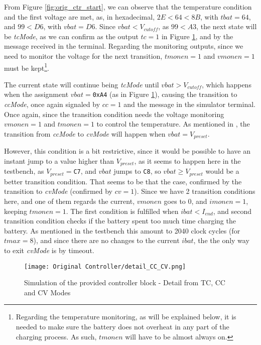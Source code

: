 \documentclass[12pt]{article}
\begin{document}
From Figure \ref{fig:orig_ctr_start}, we can observe that the temperature condition and the first voltage are met, as, in hexadecimal, $2E<64<8B$, with $tbat=64$, and $99<D6$, with $vbat=D6$. Since $vbat<V_{cutoff}$, as $99<A3$, the next state will be \textit{tcMode}, as we can confirm as the output $tc=1$ in Figure \ref{fig:orig_cc_cv}, and by the message received in the terminal. Regarding the monitoring outputs, since we need to monitor the voltage for the next transition, $tmonen=1$ and $vmonen=1$ must be kept\footnote{Regarding the temperature monitoring, as will be explained below, it is needed to make sure the battery does not overheat in any part of the charging process. As such, $tmonen$ will have to be almost always on.}.

The current state will continue being \textit{tcMode} until $vbat>V_{cutoff}$, which happens when the assignment $vbat=$\texttt{0xA4} (as in Figure \ref{fig:orig_cc_cv}), causing the transition to \textit{ccMode}, once again signaled by $cc=1$ and the message in the simulator terminal. Once again, since the transition condition needs the voltage monitoring $vmonen=1$ and $tmonen=1$ to control the temperature. As mentioned in \cite{batchargerPaper}, the transition from \textit{ccMode} to \textit{cvMode} will happen when $vbat=V_{preset}$. 

However, this condition is a bit restrictive, since it would be possible to have an instant jump to a value higher than $V_{preset}$, as it seems to happen here in the testbench, as $V_{preset}=$\texttt{C7}, and $vbat$ jumps to \texttt{C8}, so $vbat\geq V_{preset}$ would be a better transition condition. That seems to be that the case, confirmed by the transition to \textit{cvMode} (confirmed by $cv=1$). Since we have 2 transition conditions here, and one of them regards the current, $vmonen$ goes to $0$, and $imonen=1$, keeping $tmonen=1$. The first condition is fulfilled when $ibat<I_{end}$, and second transition condition checks if the battery spent too much time charging the battery. As mentioned in the testbench this amount to 2040 clock cycles (for $tmax=8$), and since there are no changes to the current $ibat$, the the only way to exit \textit{cvMode} is by timeout.

\begin{figure}[H]
    \centering 
    \texttt{[image: Original Controller/detail\_CC\_CV.png]}
    \caption{Simulation of the provided controller block - Detail from TC, CC and CV Modes}
    \label{fig:orig_cc_cv}
\end{figure}
\end{document}
